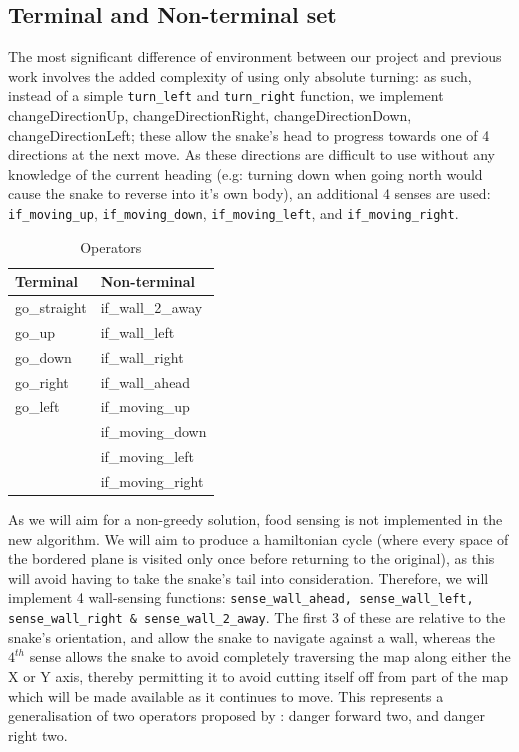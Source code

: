 \documentclass[british,10pt,a4paper]{article}
\begin{document}
\subsection{Terminal and Non-terminal set}
\label{subsec:design_terminals}
The most significant difference of environment between our project and previous work involves the added complexity of using only absolute turning: as such, instead of a simple \texttt{turn\_left} and \texttt{turn\_right} function, we implement changeDirectionUp, changeDirectionRight, changeDirectionDown, changeDirectionLeft; these allow the snake's head to progress towards one of 4 directions at the next move. As these directions are difficult to use without any knowledge of the current heading (e.g: turning down when going north would cause the snake to reverse into it's own body), an additional 4 senses are used: \texttt{if\_moving\_up}, \texttt{if\_moving\_down}, \texttt{if\_moving\_left}, and \texttt{if\_moving\_right}. \newline
\begin{table}
	\centering
	\begin{tabular}{|l|l|}
		\hline
		\textbf{Terminal} & \textbf{Non-terminal} \\ \hline
		go\_straight      & if\_wall\_2\_away     \\ \hline
		go\_up            & if\_wall\_left        \\ \hline
		go\_down          & if\_wall\_right       \\ \hline
		go\_right         & if\_wall\_ahead       \\ \hline
		go\_left         & if\_moving\_up        \\ \hline
		                  & if\_moving\_down      \\ \hline
		                  & if\_moving\_left      \\ \hline
		                  & if\_moving\_right     \\ \hline
	\end{tabular}
	\caption{Operators}
	\label{tab:operators}
\end{table}
As we will aim for a non-greedy solution, food sensing is not implemented in the new algorithm. We will aim to produce a hamiltonian cycle (where every space of the bordered plane is visited only once before returning to the original), as this will avoid having to take the snake's tail into consideration. Therefore, we will implement 4 wall-sensing functions: \texttt{sense\_wall\_ahead, sense\_wall\_left, sense\_wall\_right \& sense\_wall\_2\_away}. The first 3 of these are relative to the snake's orientation, and allow the snake to navigate against a wall, whereas the $4^{th}$ sense allows the snake to avoid completely traversing the map along either the X or Y axis, thereby permitting it to avoid cutting itself off from part of the map which will be made available as it continues to move. This represents a generalisation of two operators proposed by \citet{Christopher_Lockhart2010-em}: danger forward two, and danger right two.\newline
\end{document}
